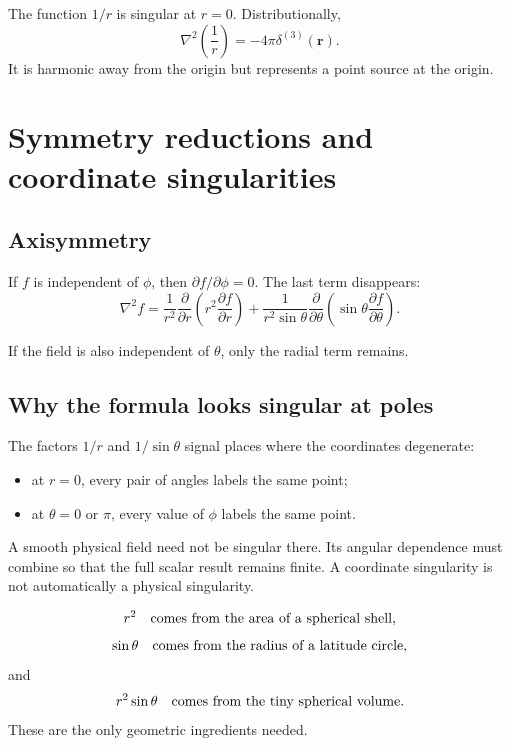 \documentclass[11pt,a4paper]{article}
\begin{document}
\begin{notecheck}
The function \(1/r\) is singular at \(r=0\). Distributionally,
\[
  \nabla^2\left(\frac1r\right)
  =-4\pi\delta^{(3)}(\bm r).
\]
It is harmonic away from the origin but represents a point source at the origin.
\end{notecheck}

\section{Symmetry reductions and coordinate singularities}

\subsection{Axisymmetry}

If \(f\) is independent of \(\phi\), then \(\partial f/\partial\phi=0\). The last term disappears:
\[
  \boxed{
  \nabla^2f
  =
  \frac{1}{r^2}\frac{\partial}{\partial r}
  \left(r^2\frac{\partial f}{\partial r}\right)
  +
  \frac{1}{r^2\sin\theta}
  \frac{\partial}{\partial\theta}
  \left(\sin\theta\frac{\partial f}{\partial\theta}\right).}
\]

If the field is also independent of \(\theta\), only the radial term remains.

\subsection{Why the formula looks singular at poles}

The factors \(1/r\) and \(1/\sin\theta\) signal places where the coordinates degenerate:
\begin{itemize}
  \item at \(r=0\), every pair of angles labels the same point;
  \item at \(\theta=0\) or \(\pi\), every value of \(\phi\) labels the same point.
\end{itemize}

A smooth physical field need not be singular there. Its angular dependence must combine so that the full scalar result remains finite. A coordinate singularity is not automatically a physical singularity.

\begin{idea}
\[
  r^2
  \quad\hbox{comes from the area of a spherical shell,}
\]
\[
  \sin\theta
  \quad\hbox{comes from the radius of a latitude circle,}
\]
and
\[
  r^2\sin\theta
  \quad\hbox{comes from the tiny spherical volume.}
\]
These are the only geometric ingredients needed.
\end{idea}
\end{document}
